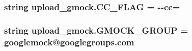 \subsubsection[{\texorpdfstring{C\+C\+\_\+\+F\+L\+AG}{CC_FLAG}}]{\setlength{\rightskip}{0pt plus 5cm}string upload\+\_\+gmock.\+C\+C\+\_\+\+F\+L\+AG = \textquotesingle{}-\/-\/cc=\textquotesingle{}}\hypertarget{namespaceupload__gmock_a463de67b37725c16ba31c5d4702e15b8}{}\label{namespaceupload__gmock_a463de67b37725c16ba31c5d4702e15b8}
\subsubsection[{\texorpdfstring{G\+M\+O\+C\+K\+\_\+\+G\+R\+O\+UP}{GMOCK_GROUP}}]{\setlength{\rightskip}{0pt plus 5cm}string upload\+\_\+gmock.\+G\+M\+O\+C\+K\+\_\+\+G\+R\+O\+UP = \textquotesingle{}googlemock@googlegroups.\+com\textquotesingle{}}\hypertarget{namespaceupload__gmock_acf8fe60647d8c3748b0e22dcf669efee}{}\label{namespaceupload__gmock_acf8fe60647d8c3748b0e22dcf669efee}
